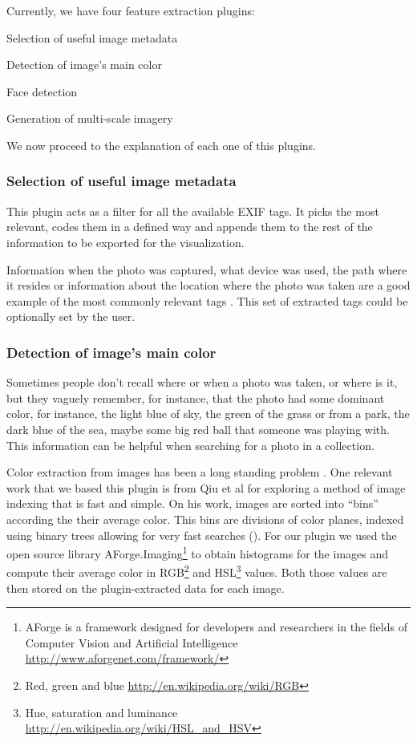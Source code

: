Currently, we have four feature extraction plugins:
\begin{myitemize}
	\item Selection of useful image metadata
	\item Detection of image’s main color
	\item Face detection
	\item Generation of multi-scale imagery
\end{myitemize}

We now proceed to the explanation of each one of this plugins. 

\subsubsection{Selection of useful image metadata}

This plugin acts as a filter for all the available \ac{EXIF} tags. It picks the most relevant, codes them in a defined way and appends them to the rest of the information to be exported for the visualization.

Information when the photo was captured, what device was used, the path where it resides or information about the location where the photo was taken are a good example of the most commonly relevant tags . This set of extracted tags could be optionally set by the user.



\subsubsection{Detection of image’s main color}

Sometimes people don’t recall where or when a photo was taken, or where is it, but they vaguely remember, for instance, that the photo had some dominant color, for instance, the light blue of sky, the green of the grass or from a park, the dark blue of the sea, maybe some big red ball that someone was playing with. This information can be helpful when searching for a photo in a collection.

Color extraction from images has been a long standing problem . One relevant work that we based this plugin is from Qiu et al\cite{Qiu:2007p1207} for exploring a method of image indexing that is fast and simple. On his work, images are sorted into ``bins'' according the their average color. This bins are divisions of color planes, indexed using binary trees allowing for very fast searches (). For our plugin we used the open source library AForge.Imaging\footnote{AForge is a framework designed for developers and researchers in the fields of Computer Vision and Artificial Intelligence \url{http://www.aforgenet.com/framework/}} to obtain histograms for the images and compute their average color in RGB\footnote{Red, green and blue \url{http://en.wikipedia.org/wiki/RGB}} and HSL\footnote{Hue, saturation and luminance \url{http://en.wikipedia.org/wiki/HSL_and_HSV}} values. Both those values are then stored on the plugin-extracted data for each image.

